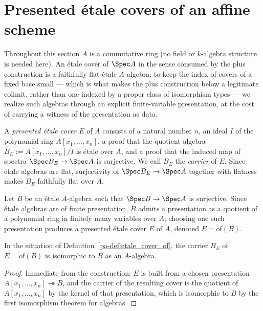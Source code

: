 \section{Presented \'etale covers of an affine scheme}

Throughout this section \(A\) is a commutative ring (no field or \(k\)-algebra structure is
needed here). An \'etale cover of \(\Spec A\) in the sense consumed by the plus construction is
a faithfully flat \'etale \(A\)-algebra; to keep the index of covers of a fixed base
small --- which is what makes the plus construction below a legitimate colimit, rather than one
indexed by a proper class of isomorphism types --- we realize such algebras through an explicit
finite-variable presentation, at the cost of carrying a witness of the presentation as data.

\begin{definition}
  \label{pa-def:etale_cover}
  \leanok

  A \emph{presented \'etale cover} \(E\) of \(A\) consists of a natural number \(n\), an ideal
  \(I\) of the polynomial ring \(A[x_1,\dots,x_n]\), a proof that the quotient algebra
  \(B_E := A[x_1,\dots,x_n]/I\) is \'etale over \(A\), and a proof that the induced map of
  spectra \(\Spec B_E \to \Spec A\) is surjective. We call \(B_E\) the \emph{carrier} of \(E\).
  Since \'etale algebras are flat, surjectivity of \(\Spec B_E \to \Spec A\) together with
  flatness makes \(B_E\) faithfully flat over \(A\).
\end{definition}

\begin{definition}
  \label{pa-def:etale_cover_of}
  \leanok

  Let \(B\) be an \'etale \(A\)-algebra such that \(\Spec B \to \Spec A\) is surjective. Since
  \'etale algebras are of finite presentation, \(B\) admits a presentation as a quotient of a
  polynomial ring in finitely many variables over \(A\); choosing one such presentation
  produces a presented \'etale cover \(E\) of \(A\), denoted \(E = \mathrm{of}(B)\).
\end{definition}

\begin{lemma}
  \label{pa-lem:etale_cover_ofEquiv}
  \leanok

  In the situation of Definition~\ref{pa-def:etale_cover_of}, the carrier \(B_E\) of
  \(E = \mathrm{of}(B)\) is isomorphic to \(B\) as an \(A\)-algebra.
\end{lemma}
\begin{proof}
  \leanok
  Immediate from the construction: \(E\) is built from a chosen presentation
  \(A[x_1,\dots,x_n] \twoheadrightarrow B\), and the carrier of the resulting cover is the
  quotient of \(A[x_1,\dots,x_n]\) by the kernel of that presentation, which is isomorphic to
  \(B\) by the first isomorphism theorem for algebras.
\end{proof}

